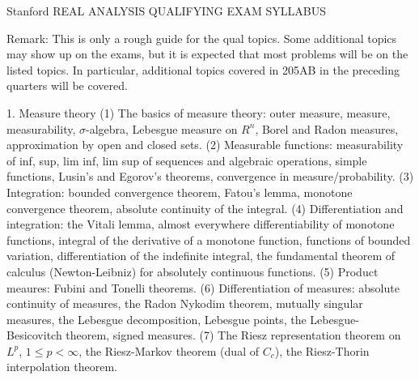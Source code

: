 Stanford REAL ANALYSIS QUALIFYING EXAM SYLLABUS

Remark: This is only a rough guide for the qual topics. Some additional topics may show up on the exams, but it is expected that most problems will be on the listed topics. In particular, additional topics covered in 205AB in the preceding quarters will be covered.

1. Measure theory
(1) The basics of measure theory: outer measure, measure, measurability, $\sigma$-algebra, Lebesgue measure on $R^n$, Borel and Radon measures, approximation by open and closed sets.
(2) Measurable functions: measurability of inf, sup, lim inf, lim sup of sequences and algebraic operations, simple functions, Lusin's and Egorov's theorems, convergence in measure/probability.
(3) Integration: bounded convergence theorem, Fatou's lemma, monotone convergence theorem, absolute continuity of the integral.
(4) Differentiation and integration: the Vitali lemma, almost everywhere differentiability of monotone functions, integral of the derivative of a monotone function, functions of bounded variation, differentiation of the indefinite integral, the fundamental theorem of calculus (Newton-Leibniz) for absolutely continuous functions.
(5) Product meaures: Fubini and Tonelli theorems.
(6) Differentiation of measures: absolute continuity of measures, the Radon Nykodim theorem, mutually singular measures, the Lebesgue decomposition, Lebesgue points, the Lebesgue-Besicovitch theorem, signed measures.
(7) The Riesz representation theorem on $L^p$, $1 \le p < \infty$, the Riesz-Markov theorem (dual of $C_c$), the Riesz-Thorin interpolation theorem.

